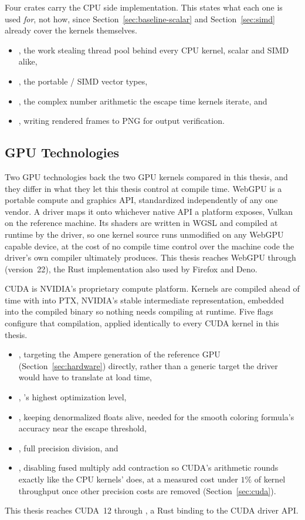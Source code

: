 \documentclass{ftndiplomski}
\begin{document}
Four crates carry the CPU side implementation. This states what each one
is used \emph{for}, not how, since Section~\ref{sec:baseline-scalar} and
Section~\ref{sec:simd} already cover the kernels themselves.
\begin{itemize}
  \item {}, the work stealing thread pool behind every CPU kernel,
  scalar and SIMD alike,
  \item {}, the portable / SIMD vector types,
  \item {}, the complex number arithmetic the escape time
  kernels iterate, and
  \item {}, writing rendered frames to PNG for output
  verification.
\end{itemize}

\subsection{GPU Technologies}
\label{sec:gpu-tech}

Two GPU technologies back the two GPU kernels compared in this thesis, and
they differ in what they let this thesis control at compile time. WebGPU is
a portable compute and graphics API, standardized independently of any one
vendor. A driver maps it onto whichever native API a platform exposes,
Vulkan on the reference machine. Its shaders are written in WGSL and
compiled at runtime by the driver, so one kernel source runs unmodified on
any WebGPU capable device, at the cost of no compile time control over the
machine code the driver's own compiler ultimately produces. This thesis
reaches WebGPU through  (version~22), the Rust implementation
also used by Firefox and Deno.

CUDA is NVIDIA's proprietary compute platform. Kernels are
compiled ahead of time with  into PTX, NVIDIA's stable
intermediate representation, embedded into the compiled binary so nothing
needs compiling at runtime. Five flags configure that compilation, applied
identically to every CUDA kernel in this thesis.
\begin{itemize}
  \item {}, targeting the Ampere generation of
  the reference GPU (Section~\ref{sec:hardware}) directly, rather than a
  generic target the driver would have to translate at load time,
  \item {}, 's highest optimization level,
  \item {}, keeping denormalized floats alive, needed for
  the smooth coloring formula's accuracy near the escape threshold,
  \item {}, full precision division, and
  \item {}, disabling fused multiply add contraction so
  CUDA's arithmetic rounds exactly like the CPU kernels' does, at a
  measured cost under $1\%$ of kernel throughput once other precision
  costs are removed (Section~\ref{sec:cuda}).
\end{itemize}
This thesis reaches CUDA~12 through , a Rust binding to the
CUDA driver API.
\end{document}
